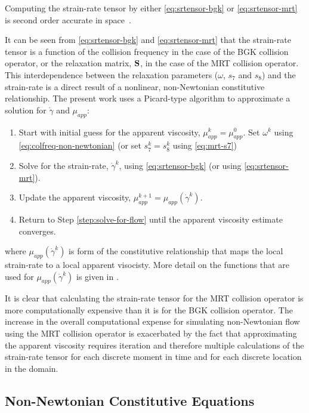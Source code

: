 \noindent Computing the strain-rate tensor by either \eqref{eq:srtensor-bgk} or \eqref{eq:srtensor-mrt} is second order accurate in space~\cite{kruger2009shear,kruger2010second}.

It can be seen from \eqref{eq:srtensor-bgk} and \eqref{eq:srtensor-mrt} that the strain-rate tensor is a function of the collision frequency in the case of the BGK collision operator, or the relaxation matrix, $\mathbf{S}$, in the case of the MRT collision operator.
This interdependence between the relaxation parameters ($\omega$, $s_7$ and $s_8$) and the strain-rate is a direct result of a nonlinear, non-Newtonian constitutive relationship.
The present work uses a Picard-type algorithm to approximate a solution for $\dot{\gamma}$ and $\mu_{app}$:

\label{sec:picard}
 \begin{enumerate} 
  \item Start with initial guess for the apparent viscosity, $\mu_{app}^k = \mu_{app}^0$.
	      Set $\omega^k$ using \eqref{eq:colfreq-non-newtonian} (or set $s_7^k = s_8^k$ using \eqref{eq:mrt-s7})
	\item \label{step:solve-for-flow} Solve for the strain-rate, $\dot{\gamma}^k$, using \eqref{eq:srtensor-bgk} (or using \eqref{eq:srtensor-mrt}).
  \item Update the apparent viscosity, $\mu_{app}^{k+1} = \mu_{app}(\dot{\gamma}^k)$.
	\item Return to Step \ref{step:solve-for-flow} until the apparent viscosity estimate converges.
 \end{enumerate} 
\noindent where $\mu_{app}(\dot{\gamma}^k)$ is form of the constitutive relationship that maps the local strain-rate to a local apparent visocisty.
More detail on the functions that are used for $\mu_{app}(\dot{\gamma}^k)$ is given in .

It is clear that calculating the strain-rate tensor for the MRT collision operator is more computationally expensive than it is for the BGK collision operator.
The increase in the overall computational expense for simulating non-Newtonian flow using the MRT collision operator is exacerbated by the fact that approximating the apparent viscosity requires iteration and therefore multiple calculations of the strain-rate tensor for each discrete moment in time and for each discrete location in the domain.

\subsection{Non-Newtonian Constitutive Equations} \label{sec:constit}

